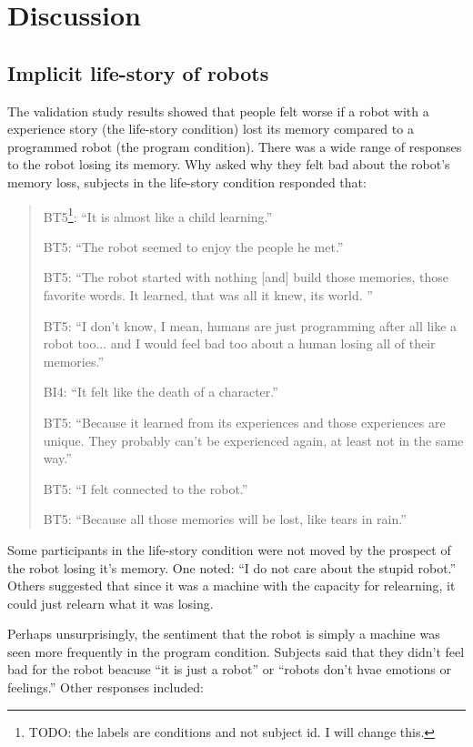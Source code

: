 
\chapter{Discussion}


\section{Implicit life-story of robots}

The validation study results showed that people felt worse if a robot with a experience story (the life-story condition) lost its memory compared to a programmed robot (the program condition). There was a wide range of responses to the robot losing its memory. Why asked why they felt bad about the robot's memory loss, subjects in the life-story condition responded that:

\begin{quotation}
BT5\footnote{TODO: the labels are conditions and not subject id. I will change this.}: ``It is almost like a child learning.''

BT5: ``The robot seemed to enjoy the people he met.''

BT5: ``The robot started with nothing [and] build those memories, those favorite words. It learned, that was all it knew, its world. ''

BT5: ``I don't know, I mean, humans are just programming after all like a robot too... and I would feel bad too about a human losing all of their memories.''

BI4: ``It felt like the death of a character.''

BT5: ``Because it learned from its experiences and those experiences are unique. They probably can't be experienced again, at least not in the same way.''

BT5: ``I felt connected to the robot.''

BT5: ``Because all those memories will be lost, like tears in rain.''
\end{quotation}

Some participants in the life-story condition were not moved by the prospect of the robot losing it's memory. One noted: ``I do not care about the stupid robot.'' Others suggested that since it was a machine with the capacity for relearning, it could just relearn what it was losing.

Perhaps unsurprisingly, the sentiment that the robot is simply a machine was seen more frequently in the program condition. Subjects said that they didn't feel bad for the robot beacuse ``it is just a robot'' or ``robots don't hvae emotions or feelings.'' Other responses included:


